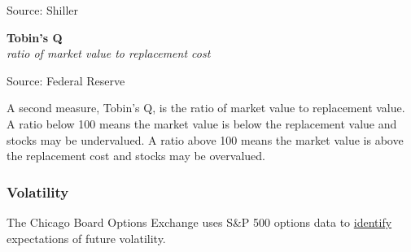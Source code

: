 \documentclass{report}
\makeatletter
\newcommand{\tbllink}[1]{\href{https://raw.githubusercontent.com/bdecon/US-chartbook/master/chartbook/data/#1}{\faTable}}
\newcommand*\short[1]{\expandafter\@gobbletwo\number\numexpr#1\relax}
\newcommand{\shdateaxisticks}{
		date coordinates in=x, axis line style={draw=none},
		xmax={2023-11-30},
		max space between ticks=40,	    
		xtick={{1990-01-01}, {1995-01-01}, {2000-01-01}, 
			{2005-01-01}, {2010-01-01}, {2015-01-01}, {2020-01-01}},
		minor xtick={},
		enlarge y limits={0.06}, enlarge x limits={0.01},
		xticklabel style={align=center, yshift=-2pt}, tick label style={inner sep=0pt},
		}
\newcommand{\bbar}[2]{extra #1 ticks = {{#2}}, extra #1 tick labels = ,
		extra #1 tick style = {grid=major, grid style={thick, black!25}},}
\newcommand{\stdline}[4]{\addplot[very thick, no markers, color=#1] 
		table [x=#2, y=#3, col sep=comma] {#4};	}
\newcommand{\rbars}{
		\fill[color=black!10] (axis cs:{1990-07-01},\pgfkeysvalueof{/pgfplots/ymin}) rectangle 
			(axis cs:{1991-03-01}, \pgfkeysvalueof{/pgfplots/ymax});
		\fill[color=black!10] (axis cs:{2007-12-01},\pgfkeysvalueof{/pgfplots/ymin}) rectangle 
			(axis cs:{2009-07-01}, \pgfkeysvalueof{/pgfplots/ymax});
		\fill[color=black!10] (axis cs:{2001-03-01},\pgfkeysvalueof{/pgfplots/ymin}) rectangle 
			(axis cs:{2001-11-01}, \pgfkeysvalueof{/pgfplots/ymax});
		\fill[color=black!10] (axis cs:{2020-02-01},\pgfkeysvalueof{/pgfplots/ymin}) rectangle 
			(axis cs:{2020-05-01}, \pgfkeysvalueof{/pgfplots/ymax});}
\makeatother
\begin{document}
{\begin{minipage}{0.37\textwidth}
\hspace{3mm} 

\footnotesize{Source: Shiller} \hfill \tbllink{catrpe.csv} \ \ \ \ \ \ \ 
\end{minipage} \hspace{3mm} \begin{minipage}{0.38\textwidth} 
\normalsize \textbf{Tobin's Q}\\
\footnotesize{\textit{ratio of market value to replacement cost}}
\vspace{2.9cm}

\hspace{4mm} 

\footnotesize{Source: Federal Reserve} \hfill \tbllink{tobinq.csv} \ \ \ \ \
\vspace{2mm}

\end{minipage}

\begin{minipage}{0.76\textwidth}
\small A second measure, Tobin's Q, is the ratio of market value to replacement value. A ratio below 100 means the market value is below the replacement value and stocks may be undervalued. A ratio above 100 means the market value is above the replacement cost and stocks may be overvalued.  
\vspace{3mm}

\subsubsection*{Volatility}  
\small The Chicago Board Options Exchange uses S\&P 500 options data to \href{http://www.cboe.com/vix}{identify} expectations of future volatility. 
\vspace{1mm}


\end{minipage}}
\end{document}
